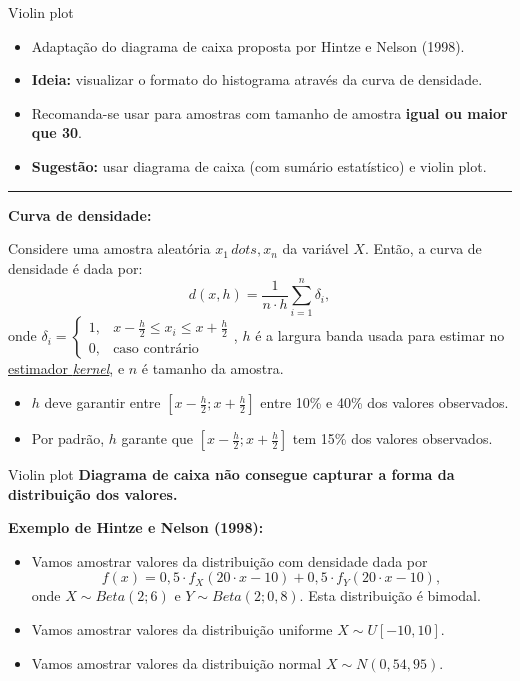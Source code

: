 \documentclass[
  10pt,
  ignorenonframetext,
]{beamer}
\providecommand{\tightlist}{%
  \setlength{\itemsep}{0pt}\setlength{\parskip}{0pt}}\usepackage{longtable,booktabs,array}
\newcommand*{\regrafina}{\rule{\textwidth}{0.5pt}}
\begin{document}
\begin{frame}{Violin plot}
\protect\hypertarget{violin-plot-1}{}
\begin{itemize}
\tightlist
\item
  Adaptação do diagrama de caixa proposta por Hintze e Nelson (1998).
\item
  \textbf{Ideia:} visualizar o formato do histograma através da curva de
  densidade.
\item
  Recomanda-se usar para amostras com tamanho de amostra \textbf{igual
  ou maior que 30}.
\item
  \textbf{Sugestão:} usar diagrama de caixa (com sumário estatístico) e
  violin plot.
\end{itemize}

\regrafina

\scriptsize

\textbf{Curva de densidade:}

Considere uma amostra aleatória \(x_1\, dots, x_n\) da variável \(X\).
Então, a curva de densidade é dada por:
\[d(x, h) = \frac{1}{n \cdot h} \sum_{i=1}^{n}\delta_i,\] onde
\(\delta_i = \begin{cases} 1, & x-\frac{h}{2} \leq x_i \leq x+\frac{h}{2}\\ 0, & \text{caso contrário} \end{cases}\),
\(h\) é a largura banda usada para estimar no
\href{https://rdrr.io/r/stats/bandwidth.html}{estimador \emph{kernel}},
e \(n\) é tamanho da amostra.

\begin{itemize}
\tightlist
\item
  \(h\) deve garantir entre
  \(\left[x - \frac{h}{2}; x + \frac{h}{2}\right]\) entre 10\% e 40\%
  dos valores observados.
\item
  Por padrão, \(h\) garante que
  \(\left[x - \frac{h}{2}; x + \frac{h}{2}\right]\) tem 15\% dos valores
  observados.
\end{itemize}

\normalsize
\end{frame}

\begin{frame}{Violin plot}
\protect\hypertarget{violin-plot-2}{}
\textbf{Diagrama de caixa não consegue capturar a forma da distribuição
dos valores.}

\textbf{Exemplo de Hintze e Nelson (1998):}

\begin{itemize}
\tightlist
\item
  Vamos amostrar valores da distribuição com densidade dada por
  \[f(x) = 0,5 \cdot  f_X(20\cdot x - 10) + 0,5 \cdot f_Y(20\cdot x - 10),\]
  onde \(X\sim Beta(2; 6)\) e \(Y\sim Beta(2; 0,8)\). Esta distribuição
  é bimodal.
\item
  Vamos amostrar valores da distribuição uniforme \(X \sim U[-10, 10]\).
\item
  Vamos amostrar valores da distribuição normal \(X \sim N(0, 54,95)\).
\end{itemize}
\end{frame}
\end{document}
